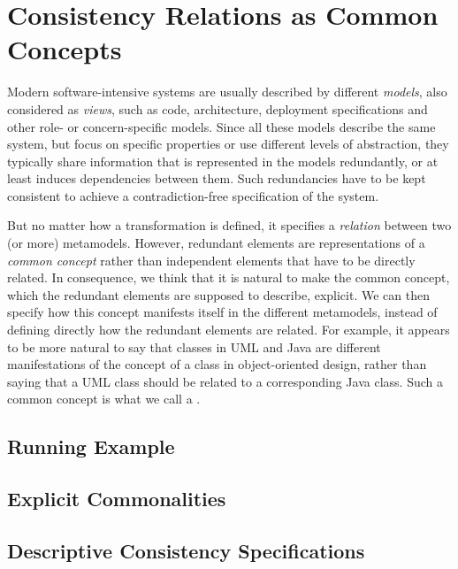 \section{Consistency Relations as Common Concepts}

Modern %
software-intensive systems are usually described by different \emph{models}, also considered as \emph{views}, such as code, architecture, deployment specifications and other role- or concern-specific models.
Since all these models describe the same system, but focus on specific properties or use different levels of abstraction, they typically share information that is represented in the models redundantly, or at least induces dependencies between them.
Such redundancies have to be kept consistent to achieve a contradiction-free specification of the %
system.

But no matter how a transformation is defined, it specifies a \emph{relation} between two (or more) metamodels.
However, redundant elements are representations of a \emph{common concept} rather than independent elements that have to be directly related.
In consequence, we think that it is natural to make the common concept, which the redundant elements are supposed to describe, explicit. 
We can then specify how this concept manifests itself in the different metamodels, instead of defining directly how the redundant elements are related.
For example, %
it appears to be more natural to say that classes in UML and Java are different manifestations of the concept of a class in object-oriented design, rather than saying that a UML class should be related to a corresponding Java class.
Such a common concept is what we call a \emph{\commonality}.




\subsection{Running Example}

\subsection{Explicit Commonalities}

\subsection{Descriptive Consistency Specifications}



